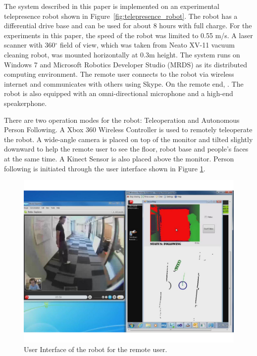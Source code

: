 The system described in this paper is implemented on an experimental telepresence robot shown in Figure~\ref{fig:telepresence_robot}. The robot has a differential drive base and can be used for about 8 hours with full charge. For the experiments in this paper, the speed of the robot was limited to 0.55 m/s. A laser scanner with 360$^{\circ}$ field of view, which was taken from Neato XV-11 vacuum cleaning robot, was mounted horizontally at 0.3m height. The system runs on Windows 7 and Microsoft Robotics Developer Studio (MRDS) as its distributed computing environment. The remote user connects to the robot via wireless internet and communicates with others using Skype. On the remote end, . The robot is also equipped with an omni-directional microphone and a high-end speakerphone.

There are two operation modes for the robot: Teleoperation and Autonomous Person Following. A Xbox 360 Wireless Controller is used to remotely teleoperate the robot.  A wide-angle camera is placed on top of the monitor and tilted slightly downward to help the remote user to see the floor, robot base and people's faces at the same time. A Kinect Sensor is also placed above the monitor. Person following is initiated through the user interface shown in Figure \ref{fig:telepresence_ui}.

\begin{figure}[h!]
\centering
\includegraphics[width=1.0\textwidth]{pics/telepresence_ui_cropped}
\caption{User Interface of the robot for the remote user.}
\label{fig:telepresence_ui}
\end{figure}

